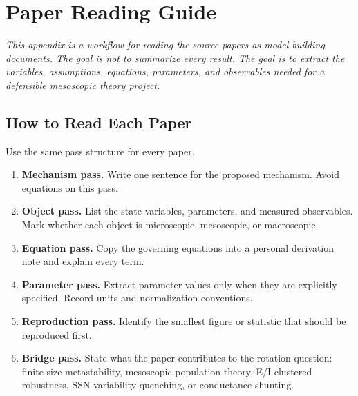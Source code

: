 \chapter{Paper Reading Guide}
\label{app:paper-reading-guide}

\textit{This appendix is a workflow for reading the source papers as model-building documents. The goal is not to summarize every result. The goal is to extract the variables, assumptions, equations, parameters, and observables needed for a defensible mesoscopic theory project.}

\section{How to Read Each Paper}
\label{app:how-to-read-each-paper}

Use the same pass structure for every paper.

\begin{enumerate}[leftmargin=*]
  \item \textbf{Mechanism pass.} Write one sentence for the proposed mechanism. Avoid equations on this pass.
  \item \textbf{Object pass.} List the state variables, parameters, and measured observables. Mark whether each object is microscopic, mesoscopic, or macroscopic.
  \item \textbf{Equation pass.} Copy the governing equations into a personal derivation note and explain every term.
  \item \textbf{Parameter pass.} Extract parameter values only when they are explicitly specified. Record units and normalization conventions.
  \item \textbf{Reproduction pass.} Identify the smallest figure or statistic that should be reproduced first.
  \item \textbf{Bridge pass.} State what the paper contributes to the rotation question: finite-size metastability, mesoscopic population theory, E/I clustered robustness, SSN variability quenching, or conductance shunting.
\end{enumerate}

